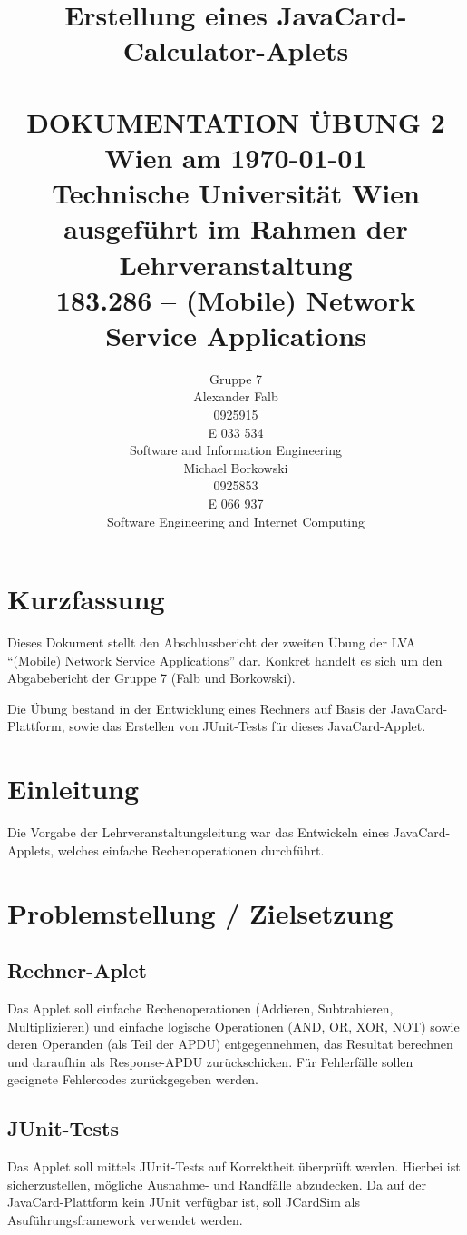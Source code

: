\documentclass[paper=a4, fontsize=11pt]{scrartcl}
\title{	\normalsize Erstellung eines JavaCard-Calculator-Aplets%
	\\[2.0cm] \HRule{0.5pt} \\
	\LARGE \textbf{\uppercase{Dokumentation Übung 2}} %
	\HRule{2pt} \\[1.5cm]
	\normalsize Wien am \today \\
	\normalsize Technische Universität Wien \\[1.0cm]
	\normalsize ausgeführt im Rahmen der Lehrveranstaltung \\
	\LARGE 183.286 – (Mobile) Network Service Applications
}
\author{
	Gruppe 7 \\[2.0cm]
	Alexander Falb \\
	0925915 \\
	E 033 534 \\
	Software and Information Engineering \\[2.0cm]
	Michael Borkowski \\
	0925853 \\
	E 066 937 \\
	Software Engineering and Internet Computing \\[2.0cm]
}
\makeatletter
\def\printtitle{%
	{\centering \@title\par}}
\def\printauthor{%
	{\centering \normalsize \@author}}
\makeatother
\begin{document}
\thispagestyle{empty} %
\printtitle
	\vfill
\printauthor

\newpage
\tableofcontents

\newpage
\section{Kurzfassung}
Dieses Dokument stellt den Abschlussbericht der zweiten Übung der LVA \enquote{(Mobile) Network Service Applications} dar. Konkret handelt es sich um den Abgabebericht der Gruppe 7 (Falb und Borkowski).

Die Übung bestand in der Entwicklung eines Rechners auf Basis der JavaCard-Plattform, sowie das Erstellen von JUnit-Tests für dieses JavaCard-Applet.


\section{Einleitung}
Die Vorgabe der Lehrveranstaltungsleitung war das Entwickeln eines JavaCard-Applets, welches einfache Rechenoperationen durchführt.

\section{Problemstellung / Zielsetzung}
\subsection{Rechner-Aplet}
Das Applet soll einfache Rechenoperationen (Addieren, Subtrahieren, Multiplizieren) und einfache logische Operationen (AND, OR, XOR, NOT) sowie deren Operanden (als Teil der APDU) entgegennehmen, das Resultat berechnen und daraufhin als Response-APDU zurückschicken. Für Fehlerfälle sollen geeignete Fehlercodes zurückgegeben werden.

\subsection{JUnit-Tests}
Das Applet soll mittels JUnit-Tests auf Korrektheit überprüft werden. Hierbei ist sicherzustellen, mögliche Ausnahme- und Randfälle abzudecken. Da auf der JavaCard-Plattform kein JUnit verfügbar ist, soll JCardSim als Asuführungsframework verwendet werden.
\end{document}
